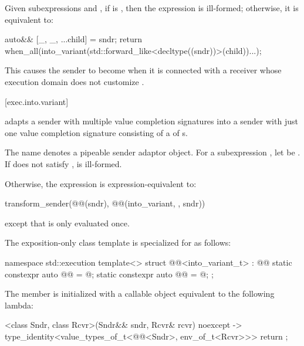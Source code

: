 \pnum
Given subexpressions  and ,
if
is ,
then the expression 
is ill-formed;
otherwise, it is equivalent to:
\begin{codeblock}
auto&& [_, _, ...child] = sndr;
return when_all(into_variant(std::forward_like<decltype((sndr))>(child))...);
\end{codeblock}
\begin{note}
This causes the  sender
to become 
when it is connected with a receiver
whose execution domain does not customize .
\end{note}

[exec.into.variant]{}

\pnum
{} adapts a sender with multiple value completion signatures
into a sender with just one value completion signature
consisting of a  of s.

\pnum
The name  denotes a pipeable sender adaptor object.
For a subexpression , let  be .
If  does not satisfy ,
 is ill-formed.

\pnum
Otherwise, the expression 
is expression-equivalent to:
\begin{codeblock}
transform_sender(@@(sndr), @@(into_variant, {}, sndr))
\end{codeblock}
except that  is only evaluated once.

\pnum
The exposition-only class template 
is specialized for  as follows:
\begin{codeblock}
namespace std::execution {
  template<>
  struct @@<into_variant_t> : @@ {
    static constexpr auto @@ = @\seebelow@;
    static constexpr auto @@ = @\seebelow@;
  };
}
\end{codeblock}

\pnum
The member 
is initialized with a callable object equivalent to the following lambda:
\begin{codeblock}
[]<class Sndr, class Rcvr>(Sndr&& sndr, Rcvr& rcvr) noexcept
  -> type_identity<value_types_of_t<@@<Sndr>, env_of_t<Rcvr>>> {
  return {};
}
\end{codeblock}

